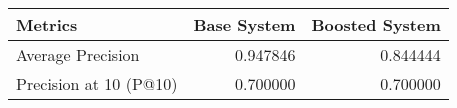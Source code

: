 \begin{tabular}{lrr}
\toprule
               Metrics &  Base System &  Boosted System \\
\midrule
     Average Precision &     0.947846 &        0.844444 \\
Precision at 10 (P@10) &     0.700000 &        0.700000 \\
\bottomrule
\end{tabular}
